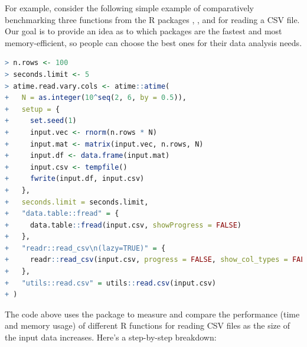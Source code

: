 \noindent For example, consider the following simple example of comparatively benchmarking three functions from the R packages , , and  for reading a CSV file. Our goal is to provide an idea as to which packages are the fastest and most memory-efficient, so people can choose the best ones for their data analysis needs.\\

\begin{lstlisting}[language=R]
> n.rows <- 100
> seconds.limit <- 5
> atime.read.vary.cols <- atime::atime(
+   N = as.integer(10^seq(2, 6, by = 0.5)),
+   setup = {
+     set.seed(1)
+     input.vec <- rnorm(n.rows * N)
+     input.mat <- matrix(input.vec, n.rows, N)
+     input.df <- data.frame(input.mat)
+     input.csv <- tempfile()
+     fwrite(input.df, input.csv)
+   },
+   seconds.limit = seconds.limit,
+   "data.table::fread" = {
+     data.table::fread(input.csv, showProgress = FALSE)
+   },
+   "readr::read_csv\n(lazy=TRUE)" = {
+     readr::read_csv(input.csv, progress = FALSE, show_col_types = FALSE, lazy = TRUE)
+   },
+   "utils::read.csv" = utils::read.csv(input.csv)
+ )
\end{lstlisting}

The code above uses the  package to measure and compare the performance (time and memory usage) of different R functions for reading CSV files as the size of the input data increases. Here's a step-by-step breakdown:

